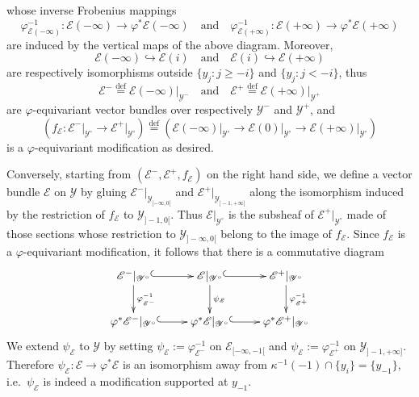 \documentclass[11pt]{article}
\theoremstyle{definition}
\numberwithin{equation}{section}
\numberwithin{figure}{section}
\numberwithin{table}{section}
\newcommand{\eqd}{\stackrel{\mathrm{def}}{=}}
\begin{document}
whose inverse Frobenius mappings
\[
\varphi_{\mathscr{\mathscr{E}}(-\infty)}^{-1}:\mathscr{\mathscr{E}}(-\infty)\rightarrow\varphi^{\ast}\mathscr{\mathscr{E}}(-\infty)\quad\text{and}\quad\varphi_{\mathscr{\mathscr{E}}(+\infty)}^{-1}:\mathscr{\mathscr{E}}(+\infty)\rightarrow\varphi^{\ast}\mathscr{\mathscr{E}}(+\infty)
\]
are induced by the vertical maps of the above diagram. Moreover,
\[
\mathscr{\mathscr{E}}(-\infty)\hookrightarrow\mathscr{\mathscr{E}}(i)\quad\text{and}\quad\mathscr{\mathscr{E}}(i)\hookrightarrow\mathscr{\mathscr{E}}(+\infty)
\]
are respectively isomorphisms outside $\{y_{j}:j\geq-i\}$ and $\{y_{j}:j<-i\}$, thus
\[
\mathscr{E}^{-}\eqd\mathscr{E}(-\infty)\vert_{\mathscr{Y}^{-}}\quad\text{and}\quad\mathscr{E}^{+}\eqd\mathscr{E}(+\infty)\vert_{\mathscr{Y}^{+}}
\]
are $\varphi$-equivariant vector bundles over respectively $\mathscr{Y}^{-}$ and $\mathscr{Y}^{+}$, and
\[
\left(f_{\mathscr{E}}:\mathscr{E}^{-}\vert_{\mathscr{Y}^{\circ}}\rightarrow\mathscr{E}^{+}\vert_{\mathscr{Y}^{\circ}}\right)\eqd\left(\mathscr{\mathscr{E}}(-\infty)\vert_{\mathscr{Y}^{\circ}}\rightarrow\mathscr{E}(0)\vert_{\mathscr{Y}^{\circ}}\rightarrow\mathscr{E}(+\infty)\vert_{\mathscr{Y}^{\circ}}\right)
\]
is a $\varphi$-equivariant modification as desired.

Conversely, starting from $(\mathscr{E}^{-},\mathscr{E}^{+},f_{\mathscr{E}})$ on the right hand side, we define a vector bundle $\mathscr{E}$ on $\mathscr{Y}$ by gluing $\mathscr{E}^{-}\vert_{\mathscr{Y}_{[-\infty,0[}}$ and $\mathscr{E}^{+}\vert_{\mathscr{Y}_{]-1,+\infty]}}$ along the isomorphism induced by the restriction of $f_{\mathscr{E}}$ to $\mathscr{Y}_{]-1,0[}$. Thus $\mathscr{E}\vert_{\mathscr{Y}^{\circ}}$ is the subsheaf of $\mathscr{E}^{+}\vert_{\mathscr{Y}^{\circ}}$ made of those sections whose restriction to $\mathscr{Y}_{]-\infty,0[}$ belong to the image of $f_{\mathscr{E}}$. Since $f_{\mathscr{E}}$ is a $\varphi$-equivariant modification, it follows that there is a commutative diagram
\[
\xymatrix{\mathscr{E}^{-}\vert_{\mathscr{Y}^{\circ}}\ar@{^{(}->}[r]\ar[d]^{\varphi_{\mathscr{E}^{-}}^{-1}} & \mathscr{E}\vert_{\mathscr{Y}^{\circ}}\ar@{^{(}->}[r]\ar[d]^{\psi_{\mathscr{E}}} & \mathscr{E}^{+}\vert_{\mathscr{Y}^{\circ}}\ar[d]^{\varphi_{\mathscr{E}^{+}}^{-1}}\\
\varphi^{\ast}\mathscr{E}^{-}\vert_{\mathscr{Y}^{\circ}}\ar@{^{(}->}[r] & \varphi^{\ast}\mathscr{E}\vert_{\mathscr{Y}^{\circ}}\ar@{^{(}->}[r] & \varphi^{\ast}\mathscr{E}^{+}\vert_{\mathscr{Y}^{\circ}} }
\]
We extend $\psi_{\mathscr{E}}$ to $\mathscr{Y}$ by setting $\psi_{\mathscr{E}}:=\varphi_{\mathscr{E}^{-}}^{-1}$ on $\mathscr{E}_{[-\infty,-1[}$ and $\psi_{\mathscr{E}}:=\varphi_{\mathscr{E}^{+}}^{-1}$ on $\mathscr{Y}_{]-1,+\infty]}$. Therefore $\psi_{\mathscr{E}}:\mathscr{E}\rightarrow\varphi^{\ast}\mathscr{E}$ is an isomorphism away from $\kappa^{-1}(-1)\cap\{y_{i}\}=\{y_{-1}\}$, i.e.~$\psi_{\mathscr{E}}$ is indeed a modification supported at $y_{-1}$.
\end{document}
